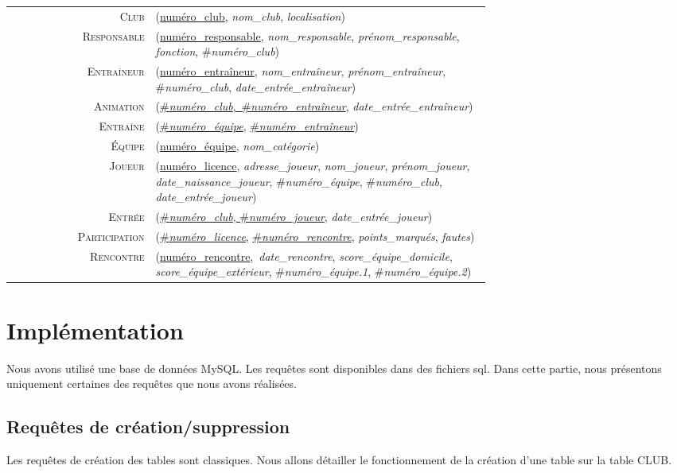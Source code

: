 \documentclass[a4paper,12pt]{article}
\newenvironment{mld}
{\par\begin{minipage}{\linewidth}\begin{tabular}{rp{0.7\linewidth}}}
{\end{tabular}\end{minipage}\par}
\newcommand{\relat}[1]{\textsc{#1}}
\newcommand{\attr}[1]{\emph{#1}}
\newcommand{\prim}[1]{\uline{#1}}
\newcommand{\foreign}[1]{\#\textsl{#1}}
\begin{document}
\begin{mld}
  \relat{Club} & (\prim{numéro\_club}, \attr{nom\_club}, \attr{localisation})\\
  \relat{Responsable} & (\prim{numéro\_responsable}, \attr{nom\_responsable}, \attr{prénom\_responsable}, \attr{fonction}, \foreign{numéro\_club})\\
  \relat{Entraîneur} & (\prim{numéro\_entraîneur}, \attr{nom\_entraîneur}, \attr{prénom\_entraîneur}, \foreign{numéro\_club}, \attr{date\_entrée\_entraîneur})\\
  \relat{Animation} & (\prim{\foreign{numéro\_club},~\foreign{numéro\_entraîneur}}, \attr{date\_entrée\_entraîneur})\\
  \relat{Entraîne} & (\prim{\foreign{numéro\_équipe}}, \prim{\foreign{numéro\_entraîneur}})\\
  \relat{Équipe} & (\prim{numéro\_équipe}, \attr{nom\_catégorie})\\
  \relat{Joueur} & (\prim{numéro\_licence}, \attr{adresse\_joueur}, \attr{nom\_joueur}, \attr{prénom\_joueur}, \attr{date\_naissance\_joueur}, \foreign{numéro\_équipe}, \foreign{numéro\_club}, \attr{date\_entrée\_joueur})\\
  \relat{Entrée} & (\prim{\foreign{numéro\_club}, \foreign{numéro\_joueur}}, \attr{date\_entrée\_joueur})\\
  \relat{Participation} & (\prim{\foreign{numéro\_licence}}, \prim{\foreign{numéro\_rencontre}}, \attr{points\_marqués}, \attr{fautes})\\
  \relat{Rencontre} & (\prim{numéro\_rencontre},~\attr{date\_rencontre}, \attr{score\_équipe\_domicile}, \attr{score\_équipe\_extérieur}, \foreign{numéro\_équipe.1}, \foreign{numéro\_équipe.2})\\
\end{mld}

\section{Implémentation}
Nous avons utilisé une base de données MySQL. Les requêtes sont disponibles dans des fichiers sql. Dans cette partie, nous présentons uniquement certaines des requêtes que nous avons réalisées.

\subsection{Requêtes de création/suppression}
Les requêtes de création des tables sont classiques. Nous allons détailler le fonctionnement de la création d'une table sur la table \textsf{CLUB}.\\
\end{document}

